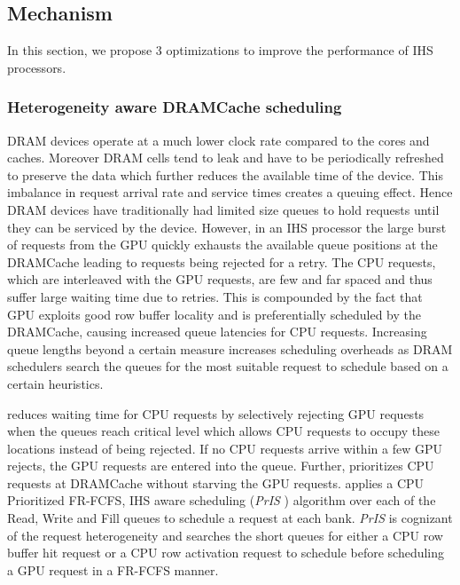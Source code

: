 \newcommand{\bypassname}{\textit{ByE }}
\newcommand{\prioname}{\textit{PrIS }}
\subsection{\cachename Mechanism} \label{mechanism}
In this section, we propose 3 optimizations to improve the performance of IHS processors.

\subsubsection{Heterogeneity aware DRAMCache scheduling}
DRAM devices operate at a much lower clock rate compared to the cores and caches. Moreover DRAM cells tend to leak and have to be periodically refreshed to preserve the data which further reduces the available time of the device. This imbalance in request arrival rate and service times creates a queuing effect. Hence DRAM devices have traditionally had limited size queues to hold requests until they can be serviced by the device. However, in an IHS processor the large burst of requests from the GPU quickly exhausts the available queue positions at the DRAMCache  leading to requests being rejected for a retry. The CPU requests, which are interleaved with the GPU requests, are few and far spaced and thus suffer large waiting time due to retries. This is compounded by the fact that GPU exploits good row buffer locality and is preferentially scheduled by the DRAMCache, causing increased queue latencies for CPU requests. Increasing queue lengths beyond a certain measure increases scheduling overheads as DRAM schedulers search the queues for the most suitable request to schedule based on a certain heuristics.
\par \cachename reduces waiting time for CPU requests by selectively rejecting GPU requests when the queues reach critical level which allows CPU requests to occupy these locations instead of being rejected. If no CPU requests arrive within a few GPU rejects, the GPU requests are entered into the queue. Further, \cachename prioritizes CPU requests at DRAMCache without starving the GPU requests. \cachename applies a CPU Prioritized FR-FCFS, IHS aware scheduling (\prioname) algorithm over each of the Read, Write and Fill queues to schedule a request at each bank. \prioname is cognizant of the request heterogeneity and searches the short queues for either a CPU row buffer hit request or a CPU row activation request to schedule before scheduling a GPU request in a FR-FCFS manner.

